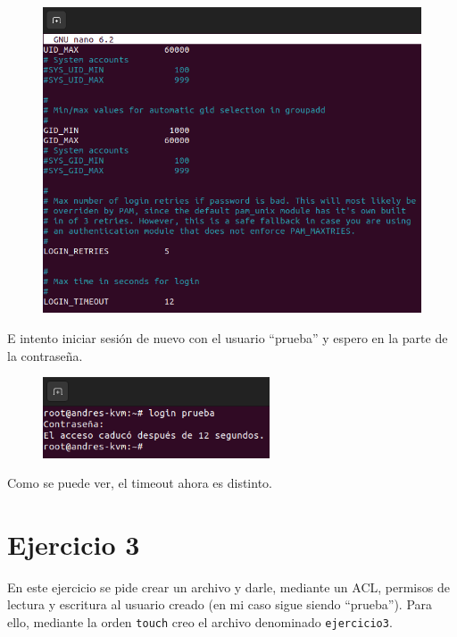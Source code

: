 \documentclass{article}
\begin{document}
\begin{figure}[H]
    \includegraphics[width=\textwidth]{imagenes/tout12.png}
\end{figure}

\bigskip

E intento iniciar sesión de nuevo con el usuario ``prueba'' y espero en la parte de la contraseña.

\begin{figure}[H]
    \centering
    \includegraphics[width=0.6\textwidth]{imagenes/tout12login.png}
\end{figure}

Como se puede ver, el timeout ahora es distinto.


\section*{Ejercicio 3}
En este ejercicio se pide crear un archivo y darle, mediante un ACL, permisos de lectura y escritura al usuario creado (en mi caso sigue siendo ``prueba''). Para ello, mediante la orden \verb|touch| creo el archivo denominado \verb|ejercicio3|.

\bigskip
\end{document}
